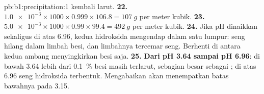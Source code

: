 \begin{solution}{pb:b1:precipitation:1}
kembali larut.
\textbf{22.} $\num{1.0e-3} \times 1000 \times 0.999 \times 106.8 =
\qty{107}{g}$ per meter kubik.
\textbf{23.} $\num{5.0e-3} \times 1000 \times 0.99 \times 99.4 =
\qty{492}{g}$ per meter kubik.
\textbf{24.} Jika pH dinaikkan sekaligus di atas 6.96, kedua hidroksida
mengendap dalam satu lumpur: seng hilang dalam limbah besi, dan limbahnya
tercemar seng. Berhenti di antara kedua ambang menyingkirkan besi saja.
\textbf{25.} \textbf{Dari pH 3.64 sampai pH 6.96}: di bawah 3.64 lebih
dari \qty{0.1}{\percent} besi masih terlarut, sebagian besar sebagai
; di atas 6.96 seng hidroksida terbentuk. Mengabaikan
 akan menempatkan batas bawahnya pada 3.15.
\end{solution}
